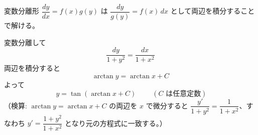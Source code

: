 
変数分離形 $\dfrac{dy}{dx} = f(x)g(y)$ は $\dfrac{dy}{g(y)} = f(x)\,dx$ として両辺を積分することで解ける。

変数分離して
\[
\frac{dy}{1+y^{2}} = \frac{dx}{1+x^{2}}
\]
両辺を積分すると
\[
\arctan y = \arctan x + C
\]
よって
\[
\boxed{\; y = \tan(\arctan x + C) \;}
\qquad (C \text{ は任意定数})
\]
（検算: $\arctan y = \arctan x + C$ の両辺を $x$ で微分すると $\dfrac{y'}{1+y^{2}} = \dfrac{1}{1+x^{2}}$、すなわち $y' = \dfrac{1+y^{2}}{1+x^{2}}$ となり元の方程式に一致する。）
